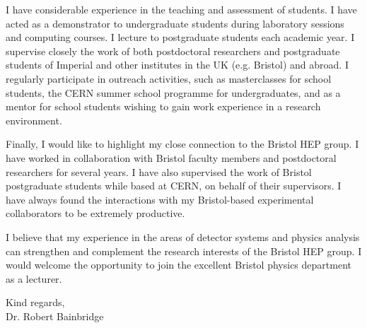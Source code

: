 \documentclass[11pt,a4paper,sans]{moderncv}
\begin{document}
\vspace{0.1cm}

\hspace{0.0cm}I have considerable experience in the teaching and
assessment of students. I have acted as a demonstrator to
undergraduate students during laboratory sessions and computing
courses. I lecture to postgraduate students each academic year. I
supervise closely the work of both postdoctoral researchers and
postgraduate students of Imperial and other institutes in the UK
(e.g. Bristol) and abroad. I regularly participate in outreach
activities, such as masterclasses for school students, the CERN summer
school programme for undergraduates, and as a mentor for school
students wishing to gain work experience in a research environment.

\vspace{0.1cm}

\hspace{0.0cm}Finally, I would like to highlight my close connection
to the Bristol HEP group. I have worked in collaboration with Bristol
faculty members and postdoctoral researchers for several years. I have
also supervised the work of Bristol postgraduate students while based
at CERN, on behalf of their supervisors. I have always found the
interactions with my Bristol-based experimental collaborators to be
extremely productive.

\vspace{0.1cm}

\hspace{0.0cm}I believe that my experience in the areas of detector
systems and physics analysis can strengthen and complement the
research interests of the Bristol HEP group.  I would welcome the
opportunity to join the excellent Bristol physics department as a
lecturer.

\vspace{0.2cm}
Kind regards, \\
Dr. Robert Bainbridge
\end{document}

